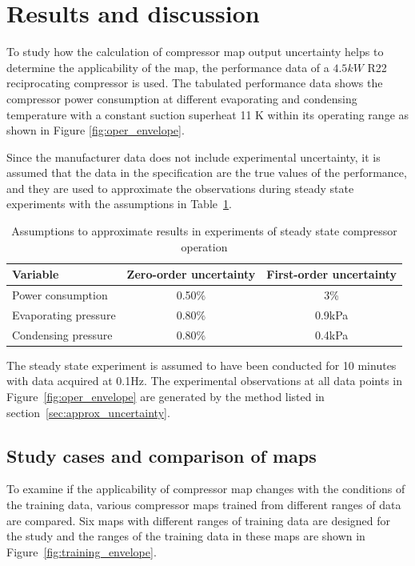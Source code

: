 \section{Results and discussion}
\label{sec:results_discussion}
To study how the calculation of compressor map output uncertainty helps to determine the applicability of the map, the performance data of a $4.5 kW$ R22 reciprocating compressor is used. The tabulated performance data shows the compressor power consumption at different evaporating and condensing temperature with a constant suction superheat 11 K within its operating range as shown in Figure \ref{fig:oper_envelope}.


Since the manufacturer data does not include experimental uncertainty, it is assumed that the data in the specification are the true values of the performance, and they are used to approximate the observations during steady state experiments with the assumptions in Table~\ref{tab:study_assumptions}.

\begin{table}[htbp]
  \centering
  \caption{Assumptions to approximate results in experiments of steady state compressor operation}
    \begin{tabular}{lcc}
    \toprule
    \textbf{Variable} & \textbf{Zero-order uncertainty} & \textbf{First-order uncertainty} \\
    \midrule
    Power consumption & 0.50\% & 3\% \\
    Evaporating pressure & 0.80\% & 0.9kPa \\
    Condensing pressure & 0.80\% & 0.4kPa \\
    \bottomrule
    \end{tabular}%
  \label{tab:study_assumptions}%
\end{table}%

The steady state experiment is assumed to have been conducted for 10 minutes with data acquired at 0.1Hz. The experimental observations at all data points in Figure~\ref{fig:oper_envelope} are generated by the method listed in section~\ref{sec:approx_uncertainty}.\\

\subsection{Study cases and comparison of maps}
\label{sec:study_cases}

To examine if the applicability of compressor map changes with the conditions of the training data, various compressor maps trained from different ranges of data are compared. Six maps with different ranges of training data are designed for the study and the ranges of the training data in these maps are shown in Figure~\ref{fig:training_envelope}.

